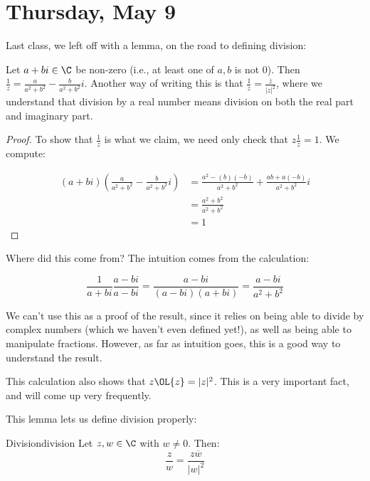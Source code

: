 
\section{Thursday, May 9}


Last class, we left off with a lemma, on the road to defining division:

\begin{manuallemma}{1.1} Let $a+bi\in \C$ be non-zero (i.e., at least one of $a,b$ is not 0). Then $\frac{1}{z} = \frac{a}{a^2 + b^2} - \frac{b}{a^2 + b^2}i$. Another way of writing this is that $\frac{1}{z} = \frac{\overline{z}}{\left|z\right|^2}$, where we understand that division by a real number means division on both the real part and imaginary part.\end{manuallemma}

\begin{proof} To show that $\frac{1}{z}$ is what we claim, we need only check that $z\frac{1}{z} = 1$. We compute:

\begin{align*}(a+bi)\left(\frac{a}{a^2 + b^2} - \frac{b}{a^2 + b^2}i\right) &= \frac{a^2 -(b)(-b)}{a^2 + b^2} + \frac{ab + a(-b)}{a^2 + b^2}i\\
&= \frac{a^2 + b^2}{a^2 + b^2}\\
&= 1\end{align*}

\end{proof}

Where did this come from? The intuition comes from the calculation:

$$\frac{1}{a+bi}{\frac{a-bi}{a-bi}} = \frac{a-bi}{(a-bi)(a+bi)} = \frac{a-bi}{a^2 + b^2}$$

We can't use this as a proof of the result, since it relies on being able to divide by complex numbers (which we haven't even defined yet!), as well as being able to manipulate fractions. However, as far as intuition goes, this is a good way to understand the result.

\begin{note} This calculation also shows that $z\OL{z} = |z|^2$. This is a very important fact, and will come up very frequently.\end{note}


This lemma lets us define division properly:

\begin{defbo}{Division}{division} 
Let $z,w\in \C$ with $w\ne 0$. Then:
$$\frac{z}{w} = \frac{z\overline{w}}{|w|^2}$$
\end{defbo}


